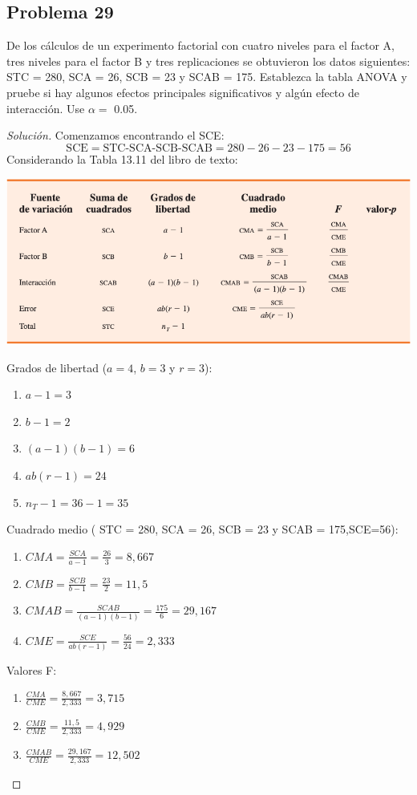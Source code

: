 \documentclass[a4paper,12pt]{article}
\newenvironment{solution}
  {\renewcommand\qedsymbol{$\blacksquare$}\begin{proof}[Solución]}
  {\end{proof}}
\begin{document}
\subsection{Problema 29}
De los cálculos de un experimento factorial con cuatro niveles para el factor A, tres niveles para el factor B y tres replicaciones se obtuvieron los datos siguientes: STC = 280, SCA = 26, SCB = 23 y SCAB = 175. Establezca la tabla ANOVA y pruebe si hay algunos efectos principales significativos y algún efecto de interacción. Use $\alpha=$ 0.05.
\begin{solution}
Comenzamos encontrando el SCE: 
$$\text{SCE}=\text{STC-SCA-SCB-SCAB}=280-26-23-175=56$$
Considerando la Tabla 13.11 del libro de texto: \begin{center}
    \includegraphics[scale=0.4]{Images/28-tabla-2.png}
\end{center}
Grados de libertad ($a=4$, $b=3$ y $r=3$): 
\begin{enumerate}
    \item $a-1=3$
    \item $b-1=2$
    \item $(a-1)(b-1)=6$
    \item $ab(r-1)=24$
    \item $n_T-1=36-1=35$
\end{enumerate}
Cuadrado medio ( STC = 280, SCA = 26, SCB = 23 y SCAB = 175,SCE=56):
\begin{enumerate}
    \item $CMA=\frac{SCA}{a-1}=\frac{26}{3}=8,667$
    \item $CMB=\frac{SCB}{b-1}=\frac{23}{2}=11,5$
    \item $CMAB= \frac{SCAB}{(a-1)(b-1)}=\frac{175}{6}=29,167$
    \item $CME=\frac{SCE}{ab(r-1)}=\frac{56}{24}=2,333$
\end{enumerate}
Valores F: 
\begin{enumerate}
    \item $\frac{CMA}{CME}=\frac{8,667}{2,333}=3,715$
    \item $\frac{CMB}{CME}=\frac{11,5}{2,333}=4,929$
    \item $\frac{CMAB}{CME}=\frac{29,167}{2,333}=12,502$


\end{enumerate}
\end{solution}
\end{document}
